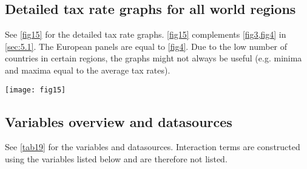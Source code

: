 \documentclass[10pt,twocolumn,oneside,cmyk]{article}
\begin{document}
\subsection{Detailed tax rate graphs for all world regions}\label{app:C5}
See \cref{fig15} for the detailed tax rate graphs. \cref{fig15} complements \cref{fig3,fig4} in \cref{sec:5.1}. The European panels are equal to \cref{fig4}. Due to the low number of countries in certain regions, the graphs might not always be useful (e.g. minima and maxima equal to the average tax rates).

\begin{figure*}[!]
 \centering \captionsetup{width=0.95\linewidth}
   \texttt{[image: fig15]}
 \caption[Corporate tax rates across the world (detailed world regions)]{Corporate tax rates across the world (detailed world regions). Solid black lines represent unweighted mean tax rates, dashed lines depict minimum and maximum tax rates, and the shaded area shows the mean tax rate $\pm$ 1 standard deviation. The red line depicts the Swiss tax rate. Tax data is taken from \textcite{kpmg_corporate_2017}. Countries are assigned to geographic regions based on United \textcite{united_nations_methodology_2017}, see \cref{app:C2}. Source: own figure.} \label{fig15}
\end{figure*}

\subsection{Variables overview and datasources}\label{app:C6}
See \cref{tab19} for the variables and datasources. Interaction terms are constructed using the variables listed below and are therefore not listed.
\newpage
\end{document}
